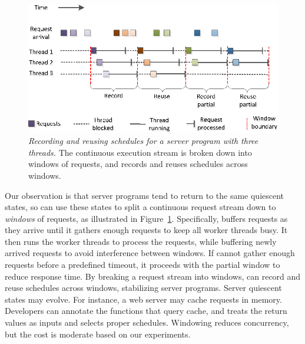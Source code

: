 \begin{figure}[t]
\includegraphics[width=\linewidth]{peregrine/figures/window-idea}
\vspace{-.3in}
\caption{{\em Recording and reusing schedules for a server program with
    three threads.}  The continuous execution stream is broken down into
  windows of requests, and \peregrine records and reuses schedules across
  windows.} \label{fig:window}
\end{figure}

Our observation is that server programs tend to return to the same
quiescent states, so \peregrine can use these states to split a continuous
request stream down to \emph{windows} of requests, as illustrated in
Figure~\ref{fig:window}.  Specifically, \peregrine buffers requests as they
arrive until it gathers enough requests to keep all worker threads busy.
It then runs the worker threads to process the requests, while buffering
newly arrived requests to avoid interference between windows.  If \peregrine
cannot gather enough requests before a predefined timeout, it proceeds
with the partial window to reduce response time.  By breaking a request
stream into windows, \peregrine can record and reuse schedules across
windows, stabilizing server programs.  
Server quiescent states may evolve.  For instance, a web server may cache
requests in memory.  Developers can annotate the functions that query
cache, and \peregrine treats the return values as inputs and selects proper
schedules.
Windowing reduces concurrency, but the cost is moderate based on our 
experiments.


